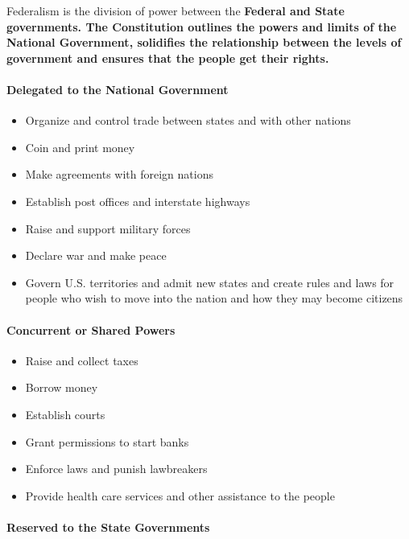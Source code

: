 \begin{definition}[Federalism]
    Federalism is the division of power between the \bf{Federal} and \bf{State} governments. The Constitution outlines the powers and limits of the \bf{National Government}, solidifies the relationship between the levels of government and ensures that the people get their rights.
\end{definition}

\paragraph{Delegated to the National Government}

\begin{itemize}
    \item Organize and control trade between states and with other nations
    \item Coin and print money
    \item Make agreements with foreign nations
    \item Establish post offices and interstate highways
    \item Raise and support military forces
    \item Declare war and make peace
    \item Govern U.S. territories and admit new states and create rules and laws for people who wish to move into the nation and how they may become citizens
\end{itemize}

\paragraph{Concurrent or Shared Powers}

\begin{itemize}
    \item Raise and collect taxes
    \item Borrow money
    \item Establish courts
    \item Grant permissions to start banks
    \item Enforce laws and punish lawbreakers
    \item Provide health care services and other assistance to the people
\end{itemize}

\paragraph{Reserved to the State Governments}

